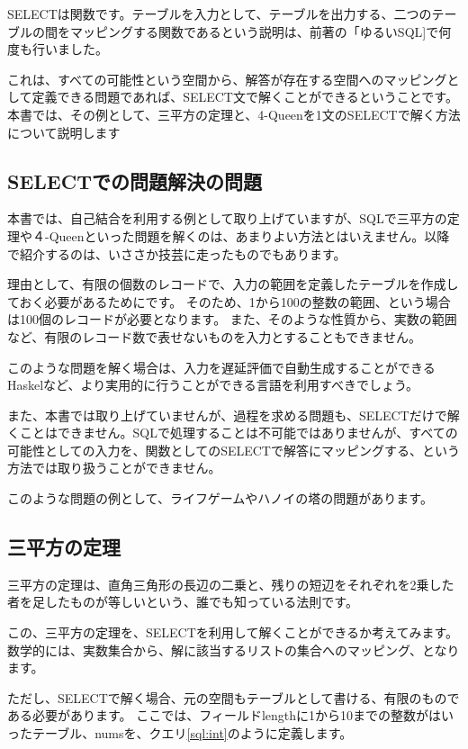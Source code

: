 SELECTは関数です。テーブルを入力として、テーブルを出力する、二つのテーブルの間をマッピングする関数であるという説明は、前著の「ゆるいSQL]で何度も行いました。

これは、すべての可能性という空間から、解答が存在する空間へのマッピングとして定義できる問題であれば、SELECT文で解くことができるということです。
本書では、その例として、三平方の定理と、4-Queenを1文のSELECTで解く方法について説明します

\subsection{SELECTでの問題解決の問題}

本書では、自己結合を利用する例として取り上げていますが、SQLで三平方の定理や４-Queenといった問題を解くのは、あまりよい方法とはいえません。以降で紹介するのは、いささか技芸に走ったものでもあります。

理由として、有限の個数のレコードで、入力の範囲を定義したテーブルを作成しておく必要があるためにです。
そのため、1から100の整数の範囲、という場合は100個のレコードが必要となります。
また、そのような性質から、実数の範囲など、有限のレコード数で表せないものを入力とすることもできません。

このような問題を解く場合は、入力を遅延評価で自動生成することができるHaskelなど、より実用的に行うことができる言語を利用すべきでしょう。

また、本書では取り上げていませんが、過程を求める問題も、SELECTだけで解くことはできません。SQLで処理することは不可能ではありませんが、すべての可能性としての入力を、関数としてのSELECTで解答にマッピングする、という方法では取り扱うことができません。

このような問題の例として、ライフゲームやハノイの塔の問題があります。

\subsection{三平方の定理}

三平方の定理は、直角三角形の長辺の二乗と、残りの短辺をそれぞれを2乗した者を足したものが等しいという、誰でも知っている法則です。

この、三平方の定理を、SELECTを利用して解くことができるか考えてみます。
数学的には、実数集合から、解に該当するリストの集合へのマッピング、となります。

ただし、SELECTで解く場合、元の空間もテーブルとして書ける、有限のものである必要があります。
ここでは、フィールドlengthに1から10までの整数がはいったテーブル、numsを、クエリ\ref{sql:int}のように定義します。

